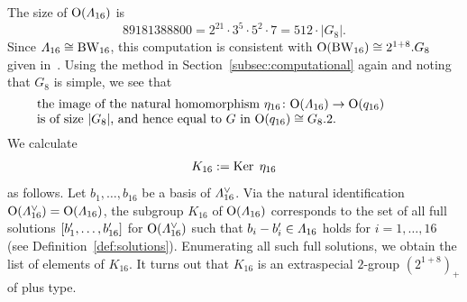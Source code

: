 \documentclass{amsart} %
\begin{document}
%
%
%
 The size of $\mathord{\mathrm{O}}(\varLambda_{16})$ is
 \[
 89181388800=2^{21}\cdot 3^5\cdot 5^2\cdot 7=512\cdot |G_8|.
 \]
 Since $\varLambda_{16}\cong \mathrm{BW}_{16}$, 
this computation is  consistent with $\mathord{\mathrm{O}}(\mathrm{BW}_{16})\cong 2^{1+8}.G_8$
given in~\cite[Chapter 4, Section 10]{theCSbook}.
Using  the method in Section~\ref{subsec:computational} again
and  noting that $G_8$ is simple,
we see that 
%
\begin{equation}\label{eq:Imageeta16}
\parbox{11cm}{
\textrm{%
the image of 
the natural homomorphism $\eta_{16}\colon \OG(\Lamsxtn)\to \OG(q_{16})$ \\
 is of size $|G_8|$, and hence  
equal to $G$ in $\OG(q_{16})\cong G_8.2$.
}
}
\end{equation}
%
%
We calculate
\[
K_{16}:=\operatorname{Ker} \;\eta_{16}
\]
as follows.
Let $b_1, \dots, b_{16}$ be a basis of $\varLambda_{16}^{\vee}$.
Via the 
natural  identification $\mathord{\mathrm{O}}(\varLambda_{16}^{\vee})=\mathord{\mathrm{O}}( \varLambda_{16})$,
the subgroup
$K_{16}$ of $\mathord{\mathrm{O}}( \varLambda_{16})$
corresponds to the set of 
all full solutions $[b_1^{\prime}, \dots, b_{16}^{\prime}]$ for $\mathord{\mathrm{O}}( \varLambda_{16}^{\vee})$
such that $b_i-b_i^{\prime}\in \varLambda_{16}$ holds for $i=1, \dots, 16$
(see Definition~\ref{def:solutions}).
Enumerating all such full solutions,
we obtain  the list of elements of $K_{16}$.
It turns out that 
$K_{16}$ is an extraspecial $2$-group $(2^{1+8})_{+}$ of plus type.
%
%
%
\end{document}
